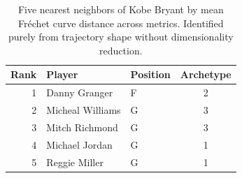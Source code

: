 \begin{table}[htbp]
  \centering\small
  \begin{tabular}{rllc}
    \toprule
    Rank & Player & Position & Archetype \\
    \midrule
    1 & Danny Granger & F & 2 \\
    2 & Micheal Williams & G & 3 \\
    3 & Mitch Richmond & G & 3 \\
    4 & Michael Jordan & G & 1 \\
    5 & Reggie Miller & G & 1 \\
    \bottomrule
  \end{tabular}
  \caption{Five nearest neighbors of Kobe Bryant by mean Fr\'{e}chet curve distance across metrics. Identified purely from trajectory shape without dimensionality reduction.}
  \label{tab:Kobe_Bryant_frechet_curve_neighbors}
\end{table}

